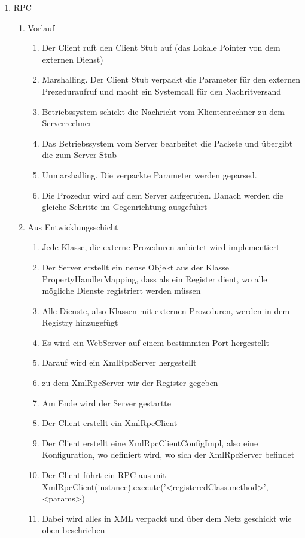 \begin{enumerate}
\item RPC \\

\begin{enumerate}

\item Vorlauf

\begin{enumerate}
    \item Der Client ruft den Client Stub auf (das Lokale Pointer von dem externen Dienst) 
    \item Marshalling. Der Client Stub verpackt die Parameter für den externen Prezeduraufruf und macht ein Systemcall für den Nachritversand
    \item Betriebssystem schickt die Nachricht vom Klientenrechner zu dem Serverrechner
    \item Das Betriebssystem vom Server bearbeitet die Packete und übergibt die zum Server Stub
    \item Unmarshalling. Die verpackte Parameter werden geparsed.
    \item Die Prozedur wird auf dem Server aufgerufen. Danach werden die gleiche Schritte im Gegenrichtung ausgeführt
\end{enumerate}

\item Aus Entwicklungsschicht

\begin{enumerate}

\item Jede Klasse, die externe Prozeduren anbietet wird implementiert
\item Der Server erstellt ein neuse Objekt aus der Klasse PropertyHandlerMapping, dass als ein Register dient, wo alle mögliche Dienste registriert werden müssen
\item Alle Dienste, also Klassen mit externen Prozeduren, werden in dem Registry hinzugefügt
\item Es wird ein WebServer auf einem bestimmten Port hergestellt
\item Darauf wird ein XmlRpcServer hergestellt
\item zu dem XmlRpcServer wir der Register gegeben
\item Am Ende wird der Server gestartte
\item Der Client erstellt ein XmlRpcClient
\item Der Client erstellt eine XmlRpcClientConfigImpl, also eine Konfiguration, wo definiert wird, wo sich der XmlRpcServer befindet
\item Der Client führt ein RPC aus mit XmlRpcClient(instance).execute('<registeredClass.method>', <params>)
\item Dabei wird alles in XML verpackt und über dem Netz geschickt wie oben beschrieben


\end{enumerate}
\end{enumerate}
\end{enumerate}
